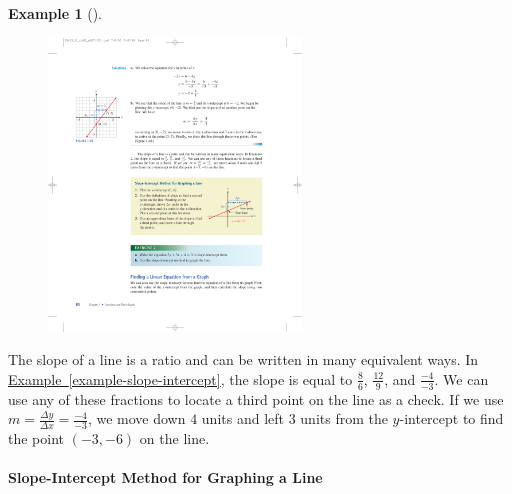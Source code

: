 \documentclass[10pt,]{book}
\theoremstyle{plain}
\theoremstyle{definition}
\theoremstyle{definition}
\theoremstyle{definition}
\newtheorem{example}[theorem]{Example}
\theoremstyle{definition}
\theoremstyle{definition}
\numberwithin{equation}{section}
\begin{document}
\begin{example}[]
\leavevmode%
\begin{figure}
\centering
\includegraphics[width=0.60\textwidth,]{images/fig-slope-intercept.pdf}\caption{\label{fig-slope-intercept}}
\end{figure}
\end{example}
\par
The slope of a line is a ratio and can be written in many equivalent ways. In \hyperref[example-slope-intercept]{Example~\ref{example-slope-intercept}}, the slope is equal to \(\frac{8}{6}\), \(\frac{12}{9}\), and \(\frac{−4}{−3}\). We can use any of these fractions to locate a third
point on the line as a check. If we use \(m = \frac{\Delta y}{\Delta x}= \frac{−4}{−3}\), we move down \(4\) units and left \(3\) units from the \(y\)-intercept to find the point \((−3, −6)\) on the line.%
\typeout{************************************************}
\typeout{************************************************}
\paragraph[Slope-Intercept Method for Graphing a Line]{Slope-Intercept Method for Graphing a Line}\label{paragraphs-16}
\end{document}
